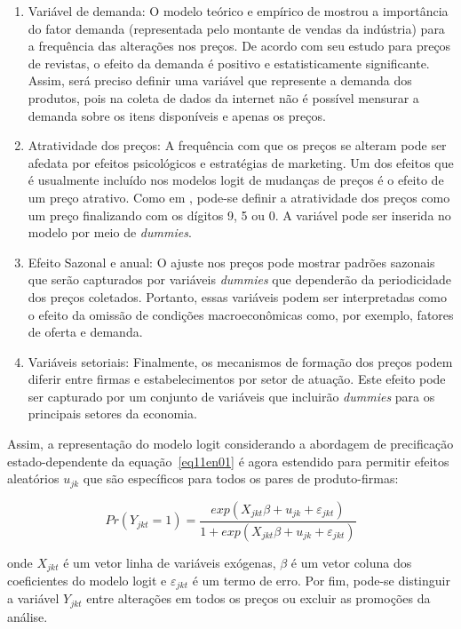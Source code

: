 \begin{algorithm}[H]
\begin{enumerate}
  \item Variável de demanda: O modelo teórico e empírico de \citet{cecchetti1986frequency} mostrou a importância do fator demanda (representada pelo montante de vendas da indústria) para a frequência das alterações nos preços. De acordo com seu estudo para preços de revistas, o efeito da demanda é positivo e estatisticamente significante. Assim, será preciso definir uma variável que represente a demanda dos produtos, pois na coleta de dados da internet não é possível mensurar a demanda sobre os itens disponíveis e apenas os preços.
  \item Atratividade dos preços: A frequência com que os preços se alteram pode ser afedata por efeitos psicológicos e estratégias de marketing. Um dos efeitos que é usualmente incluído nos modelos logit de mudanças de preços é o efeito de um preço atrativo. Como em \citet{aucremanne2005time}, pode-se definir a atratividade dos preços como um preço finalizando com os dígitos 9, 5 ou 0. A variável pode ser inserida no modelo por meio de \emph{dummies}.
  \item Efeito Sazonal e anual: O ajuste nos preços pode mostrar padrões sazonais que serão capturados por variáveis \emph{dummies} que dependerão da periodicidade dos preços coletados. Portanto, essas variáveis podem ser interpretadas como o efeito da omissão de condições macroeconômicas como, por exemplo, fatores de oferta e demanda. 
  \item Variáveis setoriais: Finalmente, os mecanismos de formação dos preços podem diferir entre firmas e estabelecimentos por setor de atuação. Este efeito pode ser capturado por um conjunto de variáveis que incluirão \emph{dummies} para os principais setores da economia.
\end{enumerate}

Assim, a representação do modelo logit considerando a abordagem de precificação estado-dependente da equação~\ref{eq11en01} é agora estendido para permitir efeitos aleatórios $u_{jk}$ que são específicos para todos os pares de produto-firmas:

\begin{equation}\label{eq12en01}
Pr\left( { Y }_{ jkt }=1 \right) =\frac { exp\left( { X }_{ jkt }\beta +{ u }_{ jk }+{ \varepsilon  }_{ jkt } \right)  }{ 1+exp\left( { X }_{ jkt }\beta +{ u }_{ jk }+{ \varepsilon  }_{ jkt } \right)  } 
\end{equation}

\noindent onde ${ X }_{ jkt }$ é um vetor linha de variáveis exógenas, $\beta$ é um vetor coluna dos coeficientes do modelo logit e ${ \varepsilon  }_{ jkt }$ é um termo de erro. Por fim, pode-se distinguir a variável $Y_{jkt}$ entre alterações em todos os preços ou excluir as promoções da análise. 


\end{algorithm}
